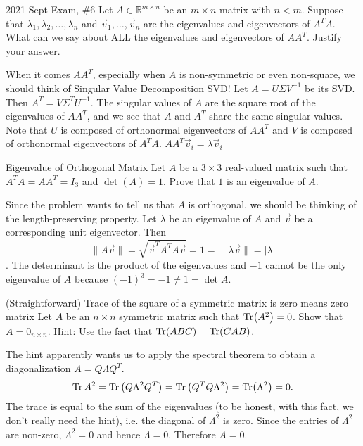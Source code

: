 \documentclass[../main]{subfiles}
\begin{document}
\begin{bbox}{{2021 Sept Exam, \#6}}
Let $A \in \mathbb R^{m\times n}$ be an $m\times n$ matrix with $n < m$. Suppose that $\lambda_1,\lambda_2,\dots, \lambda_n$ and $\vec v_1,\dots, \vec v_n$ are the eigenvalues and eigenvectors of $A^TA$. What can we say about ALL the eigenvalues and eigenvectors of $AA^T$. Justify your answer.
\end{bbox}
\begin{solution}
    When it comes $AA^T$, especially when $A$ is non-symmetric or even non-square, we should think of Singular Value Decomposition SVD! Let $A = U \Sigma V^{-1}$ be its SVD. Then $A^T = V \Sigma^{T} U^{-1}$.
    The singular values of $A$ are the square root of the eigenvalues of $AA^T$, and we see that $A$ and $A^T$ share the same singular values. Note that $U$ is composed of orthonormal eigenvectors of $AA^T$ and $V$ is composed of orthonormal eigenvectors of $A^TA$. $AA^T \vec v_i = \lambda \vec v_i $
\end{solution}
\begin{bbox}{Eigenvalue of Orthogonal Matrix}
    Let $A$ be a $3\times 3$ real-valued matrix such that $A^T A = AA^T = I_3$ and $\det (A) = 1$. Prove that $1$ is an eigenvalue of $A$.
\end{bbox}
\begin{solution}
    Since the problem wants to tell us that $A$ is orthogonal, we should be thinking of the length-preserving property. Let $\lambda$ be an eigenvalue of $A$ and $\vec v$ be a corresponding unit eigenvector. Then 
    \[
    \|A\vec v\| = \sqrt{\vec v^T A^T A \vec v} = 1 =\|\lambda \vec v\| = |\lambda|
    \]. 
    \newline
    The determinant is the product of the eigenvalues and $-1$ cannot be the only eigenvalue of $A$ because $(-1)^3 = -1 \neq 1 = \det A$.
\end{solution}
\begin{bbox}{(Straightforward) Trace of the square of a symmetric matrix is zero means zero matrix}
    Let $A$ be an $n\times n$ symmetric matrix such that $\Tr(A^2) = 0$. Show that $A = 0_{n\times n}$.
    \newline
    Hint: Use the fact that $\Tr(ABC) = \Tr(CAB)$.
\end{bbox}
\begin{solution}
    The hint apparently wants us to apply the spectral theorem to obtain a diagonalization $A = Q \Lambda Q^T$.
    \[
    \Tr A^2 = \Tr \left(Q\Lambda^2 Q^T\right) = \Tr\left(Q^T Q\Lambda^2\right) =\Tr(\Lambda^2)= 0.
    \]
    The trace is equal to the sum of the eigenvalues (to be honest, with this fact, we don't really need the hint), i.e. the diagonal of $\Lambda^2$ is zero. Since the entries of $\Lambda^2$ are non-zero, $\Lambda^2 = 0$ and hence $\Lambda = 0$. Therefore $A=0$.
\end{solution}
\end{document}
